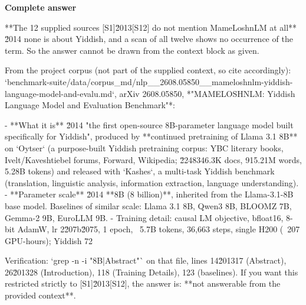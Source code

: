 \documentclass[10pt]{article}
\begin{document}
\textbf{Complete answer}
\begin{AnswerText}
**The 12 supplied sources [S1]\u2013[S12] do not mention MameLoshnLM at all** \u2014 none is about Yiddish, and a scan of all twelve shows no occurrence of the term. So the answer cannot be drawn from the context block as given.

From the project corpus (not part of the supplied context, so cite accordingly): `benchmark-suite/data/corpus_md/nlp__2608.05850__mameloshnlm-yiddish-language-model-and-evalu.md`, arXiv 2608.05850, *"MAMELOSHNLM: Yiddish Language Model and Evaluation Benchmark"*:

- **What it is** \u2014 "the first open-source 8B-parameter language model built specifically for Yiddish", produced by **continued pretraining of Llama 3.1 8B** on `Oytser` (a purpose-built Yiddish pretraining corpus: YBC literary books, Ivelt/Kaveshtiebel forums, Forward, Wikipedia; \u2248346.3K docs, 915.21M words, 5.28B tokens) and released with `Kashes`, a multi-task Yiddish benchmark (translation, linguistic analysis, information extraction, language understanding).
- **Parameter scale** \u2014 **8B (8 billion)**, inherited from the Llama-3.1-8B base model. Baselines of similar scale: Llama 3.1 8B, Qwen3 8B, BLOOMZ 7B, Gemma-2 9B, EuroLLM 9B.
- Training detail: causal LM objective, bfloat16, 8-bit AdamW, lr 2\u207b\u2075, 1 epoch, ~5.7B tokens, 36,663 steps, single H200 (~207 GPU-hours); Yiddish 72%

Verification: `grep -n -i "8B|Abstract"` on that file, lines 14\u201317 (Abstract), 26\u201328 (Introduction), 118 (Training Details), 123 (baselines). If you want this restricted strictly to [S1]\u2013[S12], the answer is: **not answerable from the provided context**.
\end{AnswerText}
\end{document}
